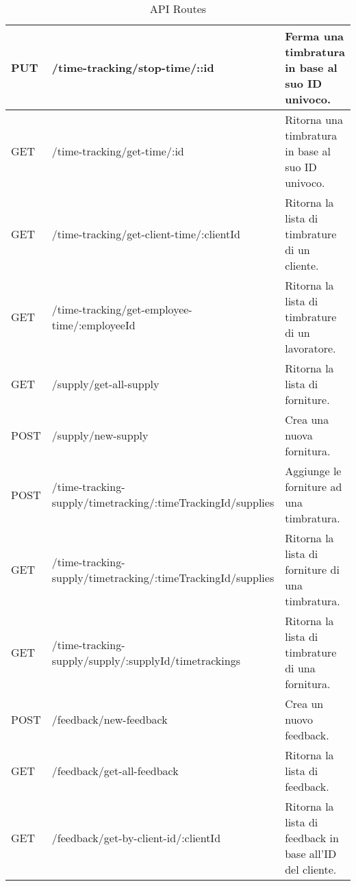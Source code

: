 \documentclass[twoside]{supsistudent}
\begin{document}
\begin{table}[h!]
{\begin{tabular}{|l|l|l|}
      PUT                  & /time-tracking/stop-time/::id                               & Ferma una timbratura in base al suo ID univoco.               \\ \hline
      GET                  & /time-tracking/get-time/:id                                 & Ritorna una timbratura in base al suo ID univoco.             \\ \hline
      GET                  & /time-tracking/get-client-time/:clientId                    & Ritorna la lista di timbrature di un cliente.                 \\ \hline
      GET                  & /time-tracking/get-employee-time/:employeeId                & Ritorna la lista di timbrature di un lavoratore.              \\ \hline
      GET                  & /supply/get-all-supply                                      & Ritorna la lista di forniture.                                \\ \hline
      POST                 & /supply/new-supply                                          & Crea una nuova fornitura.                                     \\ \hline
      POST                 & /time-tracking-supply/timetracking/:timeTrackingId/supplies & Aggiunge le forniture ad una timbratura.                      \\ \hline
      GET                  & /time-tracking-supply/timetracking/:timeTrackingId/supplies & Ritorna la lista di forniture di una timbratura.              \\ \hline
      GET                  & /time-tracking-supply/supply/:supplyId/timetrackings        & Ritorna la lista di timbrature di una fornitura.              \\ \hline
      POST                 & /feedback/new-feedback                                      & Crea un nuovo feedback.                                       \\ \hline
      GET                  & /feedback/get-all-feedback                                  & Ritorna la lista di feedback.                                 \\ \hline
      GET                  & /feedback/get-by-client-id/:clientId                        & Ritorna la lista di feedback in base all'ID del cliente.      \\ \hline
    \end{tabular}
  }
  \caption{API Routes}
  \label{tab:api_routes}
\end{table}
\end{document}
